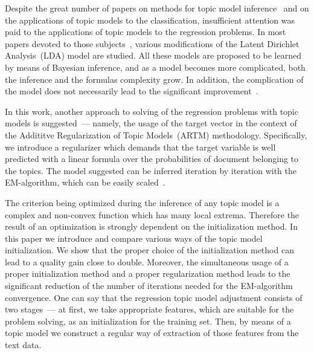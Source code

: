 \documentclass{sig-alternate-2013}
\begin{document}

Despite the great number of papers on methods for topic model
inference~\cite{blei03lda, porteous08collapsed, mimno12stochastic}
and on the applications of topic models to the classification,
insufficient attention was paid to the applications of topic models to the regression problems.
In most papers devoted to those subjects~\cite{blei07supervised, zhu09medlda, rabinovich14irtm, mimno08arbitrary},
various modifications of the Latent Dirichlet Analysis~(LDA) model are studied.
All these models are proposed to be learned by means of Bayesian inference,
and as a model becomes more complicated, both the inference
and the formulas complexity grow.
In addition, the complication of the model does not necessarily
lead to the significant improvement~\cite{zhu09medlda}.


In this work, another approach to solving of the regression problems with topic models is suggested~---
namely, the usage of the target vector in the context of
the Addititve Regularization of Topic Models~(ARTM) methodology.
Specifically, we introduce a regularizer which demands that
the target variable is well predicted with a linear formula over
the probabilities of document belonging to the topics.
The model suggested can be inferred iteration by iteration
with the EM-algorithm, which can be easily scaled~\cite{vorontsov14artm}.


The criterion being optimized during the inference of any topic model is a complex and non-convex
function which has many local extrema. Therefore the result of an optimization is strongly dependent on the initialization method. In this paper we introduce and compare various ways of the topic model initialization.
We show that the proper choice of the initialization method can lead to a quality gain close to double. Moreover, the simultaneous usage of a proper initialization method and a proper regularization method leads to the significant reduction of the number of iterations needed for the EM-algorithm convergence.
One can say that the regression topic model adjustment consists of two stages~--- at first,
we take appropriate features, which are suitable for the problem solving, as an initialization
for the training set. Then, by means of a topic model we construct a regular way of extraction of those
features from the text data.
\end{document}
